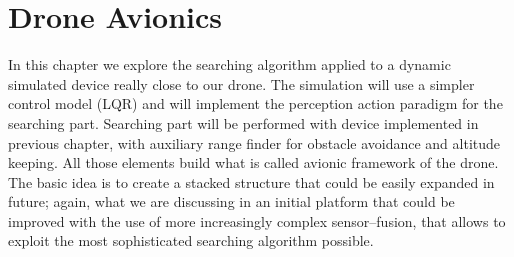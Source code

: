 \chapter{Drone Avionics}
\minitoc
\thispagestyle{plain}

\renewcommand{\arraystretch}{1.75}

In this chapter we explore the searching algorithm applied to a dynamic simulated device really close to our drone. The simulation will use a simpler control model (LQR) and will implement the perception action paradigm for the searching part. Searching part will be performed with device implemented in previous chapter, with auxiliary range finder for obstacle avoidance and altitude keeping. All those elements build what is called avionic framework of the drone. The basic idea is to create a stacked structure that could be easily expanded in future; again, what we are discussing in an initial platform that could be improved with the use of more increasingly complex sensor--fusion, that allows to exploit the most sophisticated searching algorithm possible. 






